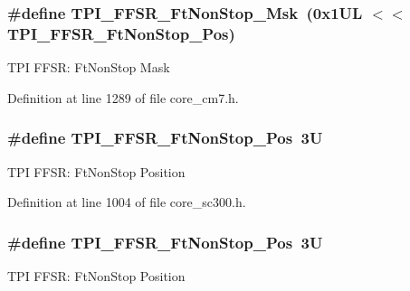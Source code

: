 \subsubsection[{\texorpdfstring{T\+P\+I\+\_\+\+F\+F\+S\+R\+\_\+\+Ft\+Non\+Stop\+\_\+\+Msk}{TPI_FFSR_FtNonStop_Msk}}]{\setlength{\rightskip}{0pt plus 5cm}\#define T\+P\+I\+\_\+\+F\+F\+S\+R\+\_\+\+Ft\+Non\+Stop\+\_\+\+Msk~(0x1\+U\+L $<$$<$ T\+P\+I\+\_\+\+F\+F\+S\+R\+\_\+\+Ft\+Non\+Stop\+\_\+\+Pos)}\hypertarget{group___c_m_s_i_s___t_p_i_gaaa313f980974a8cfc7dac68c4d805ab1}{}\label{group___c_m_s_i_s___t_p_i_gaaa313f980974a8cfc7dac68c4d805ab1}
T\+PI F\+F\+SR\+: Ft\+Non\+Stop Mask 

Definition at line 1289 of file core\+\_\+cm7.\+h.

\subsubsection[{\texorpdfstring{T\+P\+I\+\_\+\+F\+F\+S\+R\+\_\+\+Ft\+Non\+Stop\+\_\+\+Pos}{TPI_FFSR_FtNonStop_Pos}}]{\setlength{\rightskip}{0pt plus 5cm}\#define T\+P\+I\+\_\+\+F\+F\+S\+R\+\_\+\+Ft\+Non\+Stop\+\_\+\+Pos~3U}\hypertarget{group___c_m_s_i_s___t_p_i_ga9537b8a660cc8803f57cbbee320b2fc8}{}\label{group___c_m_s_i_s___t_p_i_ga9537b8a660cc8803f57cbbee320b2fc8}
T\+PI F\+F\+SR\+: Ft\+Non\+Stop Position 

Definition at line 1004 of file core\+\_\+sc300.\+h.

\subsubsection[{\texorpdfstring{T\+P\+I\+\_\+\+F\+F\+S\+R\+\_\+\+Ft\+Non\+Stop\+\_\+\+Pos}{TPI_FFSR_FtNonStop_Pos}}]{\setlength{\rightskip}{0pt plus 5cm}\#define T\+P\+I\+\_\+\+F\+F\+S\+R\+\_\+\+Ft\+Non\+Stop\+\_\+\+Pos~3U}\hypertarget{group___c_m_s_i_s___t_p_i_ga9537b8a660cc8803f57cbbee320b2fc8}{}\label{group___c_m_s_i_s___t_p_i_ga9537b8a660cc8803f57cbbee320b2fc8}
T\+PI F\+F\+SR\+: Ft\+Non\+Stop Position 

